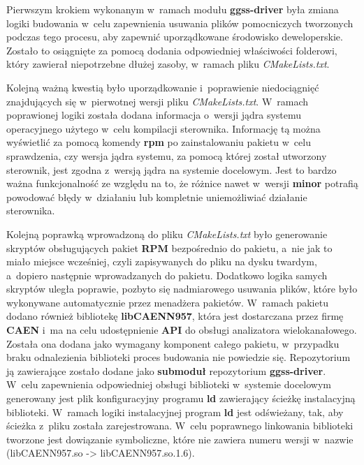 Pierwszym krokiem wykonanym w~ramach modułu \textbf{ggss-driver} była zmiana logiki budowania w~celu zapewnienia usuwania plików pomocniczych tworzonych podczas tego procesu, aby zapewnić uporządkowane środowisko deweloperskie. Zostało to osiągnięte za pomocą dodania odpowiedniej właściwości folderowi, który zawierał niepotrzebne dłużej zasoby, w~ramach pliku \textit{CMakeLists.txt}. \par
Kolejną ważną kwestią było uporządkowanie i~poprawienie niedociągnięć znajdujących się w~pierwotnej wersji pliku \textit{CMakeLists.txt}. W~ramach poprawionej logiki została dodana informacja o~wersji jądra systemu operacyjnego użytego w~celu kompilacji sterownika. Informację tą można wyświetlić za pomocą komendy \textbf{rpm} po zainstalowaniu pakietu w~celu sprawdzenia, czy wersja jądra systemu, za pomocą której został utworzony sterownik, jest zgodna z~wersją jądra na systemie docelowym. Jest to bardzo ważna funkcjonalność ze względu na to, że różnice nawet w~wersji \textbf{minor} potrafią powodować błędy w~działaniu lub kompletnie uniemożliwiać działanie sterownika.

Kolejną poprawką wprowadzoną do pliku \textit{CMakeLists.txt} było generowanie skryptów obsługujących pakiet \textbf{RPM} bezpośrednio do pakietu, a~nie jak to miało miejsce wcześniej, czyli zapisywanych do pliku na dysku twardym, a~dopiero następnie wprowadzanych do pakietu. Dodatkowo logika samych skryptów uległa poprawie, pozbyto się nadmiarowego usuwania plików, które było wykonywane automatycznie przez menadżera pakietów. W~ramach pakietu dodano również bibliotekę \textbf{libCAENN957}, która jest dostarczana przez firmę \textbf{CAEN} i~ma na celu udostępnienie \textbf{API} do obsługi analizatora wielokanałowego. Została ona dodana jako wymagany komponent całego pakietu, w~przypadku braku odnalezienia biblioteki proces budowania nie powiedzie się. Repozytorium ją zawierające zostało dodane jako \textbf{submoduł} repozytorium \textbf{ggss-driver}. W~celu zapewnienia odpowiedniej obsługi biblioteki w~systemie docelowym generowany jest plik konfiguracyjny programu \textbf{ld} zawierający ścieżkę instalacyjną biblioteki. W~ramach logiki instalacyjnej program \textbf{ld} jest odświeżany, tak, aby ścieżka z~pliku została zarejestrowana. W~celu poprawnego linkowania biblioteki tworzone jest dowiązanie symboliczne, które nie zawiera numeru wersji w~nazwie (libCAENN957.so -> libCAENN957.so.1.6).

